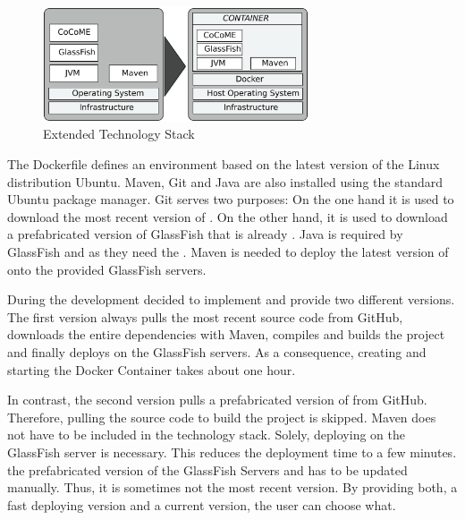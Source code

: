 	\begin{figure}[!h]
		\centering
		\includegraphics[width = 0.7\textwidth]{img/tech_stack_CoCoME.pdf}
		\caption{Extended Technology Stack \CoCoME}
		\label{techStack}
	\end{figure}
\noindent	
The Dockerfile defines an environment based on the latest version of the Linux distribution Ubuntu.
Maven, Git and Java are also installed using the standard Ubuntu package manager. %
Git serves two purposes: On the one hand it is used to download the most recent version of  \CoCoME {}.
On the other hand, it is used to download a prefabricated version of GlassFish that is already . 
Java is required by GlassFish and \CoCoME as they need the . 
Maven is needed to  deploy the latest version of \CoCoME onto the provided GlassFish servers.

During the development decided to implement and provide two different versions. 
The first version always pulls the most recent \CoCoME source code from GitHub, downloads the entire dependencies with Maven, compiles and builds the project and finally deploys \CoCoME on the GlassFish servers. 
As a consequence, creating and starting the Docker Container  takes about one hour.


In contrast, the second version pulls a prefabricated version of \CoCoME from GitHub. 
Therefore, pulling the source code to build the \CoCoME project is skipped. 
Maven does not have to be included in the technology stack. 
Solely, deploying \CoCoME on the GlassFish server is necessary.
This reduces the deployment time to a few minutes.
 the prefabricated version of the GlassFish Servers and \CoCoME has to be updated manually. 
Thus, it is sometimes not the most recent version.
By providing both, a fast deploying version and a current version, the user can choose what.
	

	

	

